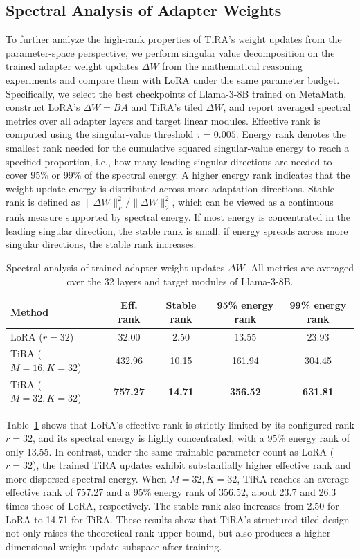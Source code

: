 \documentclass[a4paper,11pt]{article}
\newcommand{\DeltaW}{\Delta W}
\begin{document}
\subsection{Spectral Analysis of Adapter Weights}

To further analyze the high-rank properties of TiRA's weight updates from the parameter-space perspective, we perform singular value decomposition on the trained adapter weight updates $\DeltaW$ from the mathematical reasoning experiments and compare them with LoRA under the same parameter budget. Specifically, we select the best checkpoints of Llama-3-8B trained on MetaMath, construct LoRA's $\DeltaW=BA$ and TiRA's tiled $\DeltaW$, and report averaged spectral metrics over all adapter layers and target linear modules. Effective rank is computed using the singular-value threshold $\tau=0.005$. Energy rank denotes the smallest rank needed for the cumulative squared singular-value energy to reach a specified proportion, i.e., how many leading singular directions are needed to cover 95\% or 99\% of the spectral energy. A higher energy rank indicates that the weight-update energy is distributed across more adaptation directions. Stable rank is defined as $\|\DeltaW\|_F^2/\|\DeltaW\|_2^2$, which can be viewed as a continuous rank measure supported by spectral energy. If most energy is concentrated in the leading singular direction, the stable rank is small; if energy spreads across more singular directions, the stable rank increases.

\begin{table}[H]
\centering
\small
\caption{Spectral analysis of trained adapter weight updates $\DeltaW$. All metrics are averaged over the 32 layers and target modules of Llama-3-8B.}
\label{tab:delta_spectrum}
\begin{tabular}{lcccc}
\toprule
Method & Eff. rank & Stable rank & 95\% energy rank & 99\% energy rank \\
\midrule
LoRA ($r=32$) & 32.00 & 2.50 & 13.55 & 23.93 \\
TiRA ($M=16,K=32$) & 432.96 & 10.15 & 161.94 & 304.45 \\
TiRA ($M=32,K=32$) & \textbf{757.27} & \textbf{14.71} & \textbf{356.52} & \textbf{631.81} \\
\bottomrule
\end{tabular}
\end{table}

Table~\ref{tab:delta_spectrum} shows that LoRA's effective rank is strictly limited by its configured rank $r=32$, and its spectral energy is highly concentrated, with a 95\% energy rank of only 13.55. In contrast, under the same trainable-parameter count as LoRA ($r=32$), the trained TiRA updates exhibit substantially higher effective rank and more dispersed spectral energy. When $M=32,K=32$, TiRA reaches an average effective rank of 757.27 and a 95\% energy rank of 356.52, about 23.7 and 26.3 times those of LoRA, respectively. The stable rank also increases from 2.50 for LoRA to 14.71 for TiRA. These results show that TiRA's structured tiled design not only raises the theoretical rank upper bound, but also produces a higher-dimensional weight-update subspace after training.
\end{document}
